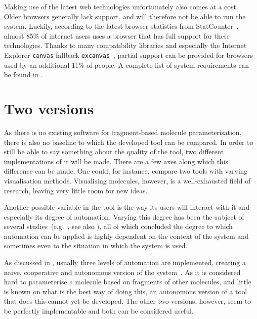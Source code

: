 Making use of the latest web technologies unfortunately also comes at a cost. Older browsers generally lack support, and will therefore not be able to run the system. Luckily, according to the latest browser statistics from StatCounter~\cite{statcounter2014statcounter}, almost 85\% of internet users uses a browser that has full support for these technologies. Thanks to many compatibility libraries and especially the Internet Explorer \verb|canvas| fallback \verb|excanvas|~\cite{arvidsson2009explorercanvas}, partial support can be provided for browsers used by an additional 11\% of people. A complete list of system requirements can be found in .


\section{Two versions}
As there is no existing software for fragment-based molecule parameterisation, there is also no baseline to which the developed tool can be compared. In order to still be able to say something about the quality of the tool, two different implementations of it will be made. There are a few axes along which this difference can be made. One could, for instance, compare two tools with varying visualisation methods. Visualising molecules, however, is a well-exhausted field of research, leaving very little room for new ideas.

Another possible variable in the tool is the way its users will interact with it and especially its degree of automation. Varying this degree has been the subject of several studies~(e.g.~\cite{payne2000varying, horvitz1999principles, marcus1987taking, norman1990problem}, see also ), all of which concluded the degree to which automation can be applied is highly dependent on the context of the system and sometimes even to the situation in which the system is used.

As discussed in , usually three levels of automation are implemented, creating a naive, cooperative and autonomous version of the system~\cite{payne2000varying}. As it is considered hard to parameterise a molecule based on fragments of other molecules, and little is known on what is the best way of doing this, an autonomous version of a tool that does this cannot yet be developed. The other two versions, however, seem to be perfectly implementable and both can be considered useful.


